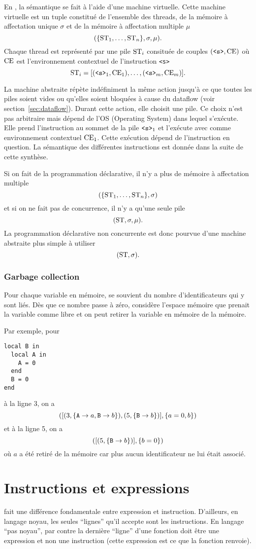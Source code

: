 En \oz{}, la sémantique se fait à l'aide d'une machine virtuelle.
Cette machine virtuelle est un tuple constitué de l'ensemble des
threads, de la mémoire à affectation unique $\sigma$ et de la mémoire
à affectation multiple $\mu$
\[ (\{\mathrm{ST}_1, \ldots, \mathrm{ST}_n\}, \sigma, \mu). \]
Chaque thread est représenté par une pile $\mathrm{ST}_i$ consituée de couples
$(\verb|<s>|, \ce)$ où $\mathrm{CE}$ est l'environnement contextuel
de l'instruction \lstinline|<s>|
\[ \st_i = [(\verb|<s>|_1, \ce_1), \ldots, (\verb|<s>|_m, \ce_m)]. \]

La machine abstraite répète indéfiniment la même action jusqu'à ce
que toutes les piles soient vides ou qu'elles soient bloquées à cause du
dataflow (voir section~\ref{sec:dataflow}).
Durant cette action, elle choisit une pile.
Ce choix n'est pas arbitraire mais dépend de l'OS (Operating System) dans
lequel \mozart{} s'exécute.
Elle prend l'instruction au sommet de la pile $\verb|<s>|_1$ et l'exécute
avec comme environnement contextuel $\mathrm{CE}_1$.
Cette exécution dépend de l'instruction en question.
La sémantique des différentes instructions est donnée dans la suite de cette
synthèse.

Si on fait de la programmation déclarative, il n'y a plus de mémoire à
affectation multiple
\[ (\{\mathrm{ST}_1, \ldots, \mathrm{ST}_n\}, \sigma) \]
et si on ne fait pas de concurrence, il n'y a qu'une seule pile
\[ (\mathrm{ST}, \sigma, \mu). \]
La programmation déclarative non concurrente est donc pourvue d'une machine abstraite
plus simple à utiliser
\[ (\mathrm{ST}, \sigma). \]

\subsubsection{Garbage collection}
Pour chaque variable en mémoire,
\oz{} se souvient du nombre d'identificateurs qui y sont liés.
Dès que ce nombre passe à zéro, \oz{} considère l'espace mémoire que
prenait la variable comme libre et on peut retirer la variable en mémoire
de la mémoire.

Par exemple, pour
\begin{lstlisting}
local B in
  local A in
    A = 0
  end
  B = 0
end
\end{lstlisting}
à la ligne 3, on a
\[ ([(3,\{\verb|A|\to a, \verb|B|\to b\}),
(5,\{\verb|B|\to b\})],\{a = 0, b\}) \]
et à la ligne 5, on a
\[ ([(5,\{\verb|B|\to b\})],\{b = 0\}) \]
où $a$ a été retiré de la mémoire car plus aucun identificateur ne
lui était associé.

\section{Instructions et expressions}
\label{sec:sv}
\oz{} fait une différence fondamentale entre expression et instruction.
D'ailleurs, en langage noyau, les seules ``lignes''
qu'il accepte sont les instructions.
En langage ``pas noyau'', par contre la dernière ``ligne'' d'une fonction doit être une expression et non une instruction (cette expression est ce que la fonction renvoie).

